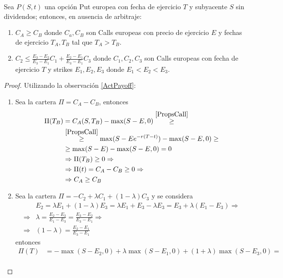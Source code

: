 \begin{proposition}
    Sea $P(S,t)$ una opción Put europea con fecha de ejercicio $T$ y subyacente $S$ sin dividendos; entonces, en ausencia de arbitraje:
    \begin{enumerate}
        \item $\boxed{C_A \geq C_B}$ donde $C_a, C_B$ son Calls europeas con precio de ejercicio $E$ y fechas de ejercicio $T_A, T_B$ tal que $T_A > T_B$.
        \item $\boxed{C_2 \leq \frac{E_3-E_2}{E_3-E_1}C_1 + \frac{E_2-E_1}{E_3-E_1}C_3}$ donde $C_1, C_2, C_3$ son Calls europeas con fecha de ejercicio $T$ y strikes $E_1, E_2, E_3$ donde $E_1<E_2<E_3$.
    \end{enumerate}
\end{proposition}
\begin{proof}
    Utilizando la observación \ref{ActPayoff}:
    \begin{enumerate}
        \item Sea la cartera $\Pi = C_A-C_B$, entonces
        \begin{align*}
            \Pi(T_B) &= C_A(S,T_B) - \max(S-E,0) \overset{\ref{PropsCall}}{\geq} \\
            &\overset{\ref{PropsCall}}{\geq} \max(S-Ee^{-r(T-t)}) - \max(S-E,0) \geq \\
            &\geq \max(S-E) - \max(S-E,0) = 0 \\
            &\Rightarrow \Pi(T_B) \geq 0 \Rightarrow \\
            &\Rightarrow \Pi(t) = C_A-C_B \geq 0 \Rightarrow \\
            &\Rightarrow C_A \geq C_B
        \end{align*}
        \item Sea la cartera $\Pi = - C_2 + \lambda C_1 + (1-\lambda) C_3 $ y se considera 
        \begin{align*}
            &E_2 = \lambda E_1 + (1-\lambda) E_3 = \lambda E_1 + E_3-\lambda E_3 = E_3 + \lambda(E_1-E_3) \Rightarrow \\
            \Rightarrow &\lambda = \frac{E_2-E_3}{E_1-E_3} = \frac{E_3-E_2}{E_3-E_1} \Rightarrow \\
            \Rightarrow &(1-\lambda) = \frac{E_2-E_1}{E_3-E_1}
        \end{align*}
        entonces
        \begin{align*}
            \Pi(T) &= -\max(S-E_2, 0) + \lambda\max(S-E_1,0) + (1+\lambda)\max(S-E_3, 0) = \\

\end{align*}
\end{enumerate}
\end{proof}
